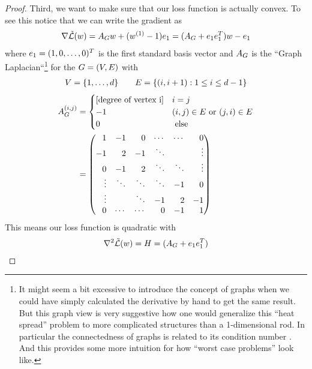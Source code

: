 \begin{proof}
	Third, we want to make sure that our loss function is actually convex. To
	see this notice that we can write the gradient as
	\begin{align}\label{eq: naive complexity example loss gradient}
		\nabla \tilde{\mathcal{L}}(w)
		= A_Gw + (w^{(1)} -1) e_1
		= (A_G + e_1 e_1^T)w - e_1
	\end{align}
	where \(e_1=(1,0,\dots,0)^T\) is the first standard basis
	vector and \(A_G\) is the ``Graph Laplacian``\footnote{
		It might seem a bit excessive to introduce the concept of graphs when
		we could have simply calculated the derivative by hand to get the same
		result. But this graph view is very suggestive how one would generalize
		this ``heat spread'' problem to more complicated structures than a
		1-dimensional rod. In particular the connectedness of graphs is related
		to its condition number \parencite{gohWhyMomentumReally2017}. And this
		provides some more intuition for how ``worst case problems'' look like.
	} for the 
	 \(G=(V, E)\) with 
	\begin{align*}
		V = \{1,\dots, d\}
		\qquad
		E = \{(i, i+1) : 1\le i \le d-1\}
	\end{align*}
	\begin{align*}
		\graphLaplacian^{(i,j)} 
		&= 
		\begin{cases}
			[\text{degree of vertex i}] & i=j\\
			-1 & (i,j)\in\edges \text{ or } (j,i)\in\edges\\
			0 & \text{ else}
		\end{cases}
		\\
		&=
		\begin{pmatrix*}[r]
			1 & -1 & 0  & \cdots & \cdots & 0 \\
			-1 & 2 & -1 & \ddots &  &  \vdots \\ 
			0 & -1 & 2 & \ddots & \ddots & \vdots \\
			\vdots & \ddots & \ddots & \ddots & -1 & 0 \\
			\vdots &  & \ddots & -1 & 2 & -1 \\
			0 & \cdots & \cdots & 0  & -1 & 1
		\end{pmatrix*}
	\end{align*}
	This means our loss function is quadratic with
	\begin{align*}
		\nabla^2\tilde{\Loss}(\weights) = H = (A_G + \stdBasis_1 \stdBasis_1^T)

\end{align*}
\end{proof}
